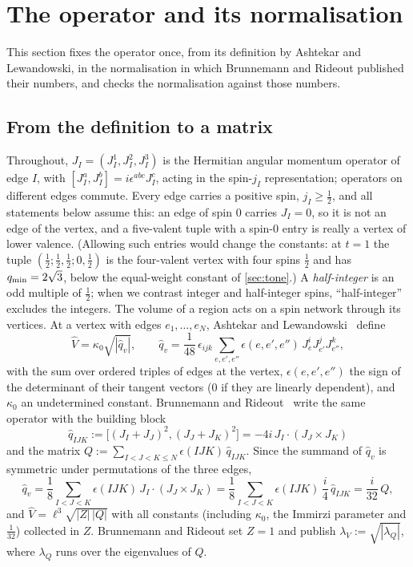 \section{The operator and its normalisation}\label{sec:operator}

This section fixes the operator once, from its definition by Ashtekar and
Lewandowski, in the normalisation in which Brunnemann and Rideout published their
numbers, and checks the normalisation against those numbers.

\subsection{From the definition to a matrix}

Throughout, $J_I=(J_I^1,J_I^2,J_I^3)$ is the Hermitian angular momentum operator of
edge $I$, with $[J_I^a,J_I^b]=i\epsilon^{abc}J_I^c$, acting in the spin-$j_I$
representation; operators on different edges commute. Every edge carries a positive
spin, $j_I\ge\frac12$, and all statements below assume this: an edge of spin $0$ carries
$J_I=0$, so it is not an edge of the vertex, and a five-valent tuple with a spin-$0$ entry
is really a vertex of lower valence. (Allowing such entries would change the constants:
at $t=1$ the tuple $(\frac12;\frac12,\frac12;0,\frac12)$ is the four-valent vertex with
four spins $\frac12$ and has $q_{\min}=2\sqrt3$, below the equal-weight constant of
\cref{sec:tone}.) A \emph{half-integer} is an odd multiple of $\frac12$; when we contrast
integer and half-integer spins, ``half-integer'' excludes the integers. The volume of a region acts
on a spin network through its vertices. At a vertex with edges $e_1,\dots,e_N$,
Ashtekar and Lewandowski~\cite[eq.~(4.13)]{AL1998} define
\[
  \hat V=\kappa_0\sqrt{|\hat q_v|},\qquad
  \hat q_v=\frac1{48}\,\epsilon_{ijk}\sum_{e,e',e''}\epsilon(e,e',e'')\,J^i_eJ^j_{e'}J^k_{e''},
\]
with the sum over ordered triples of edges at the vertex, $\epsilon(e,e',e'')$ the
sign of the determinant of their tangent vectors ($0$ if they are linearly
dependent), and $\kappa_0$ an undetermined constant. Brunnemann and
Rideout~\cite[eqs.~(2.24)--(2.26)]{BR2008b} write the same operator with the
building block
\begin{equation}\label{eq:qhat}
  \hat q_{IJK}:=\bigl[(J_I+J_J)^2,(J_J+J_K)^2\bigr]=-4i\,J_I\cdot(J_J\times J_K)
\end{equation}
and the matrix $Q:=\sum_{I<J<K\le N}\epsilon(IJK)\,\hat q_{IJK}$. Since the summand of
$\hat q_v$ is symmetric under permutations of the three edges,
\[
  \hat q_v=\frac18\sum_{I<J<K}\epsilon(IJK)\,J_I\cdot(J_J\times J_K)
  =\frac18\sum_{I<J<K}\epsilon(IJK)\,\frac i4\,\hat q_{IJK}=\frac{i}{32}\,Q,
\]
and $\hat V=\ell^3\sqrt{|Z|\,|Q|}$ with all constants (including $\kappa_0$, the
Immirzi parameter and $\frac1{32}$) collected in $Z$.
Brunnemann and Rideout set $Z=1$ and publish $\lambda_V:=\sqrt{|\lambda_Q|}$, where
$\lambda_Q$ runs over the eigenvalues of $Q$.

